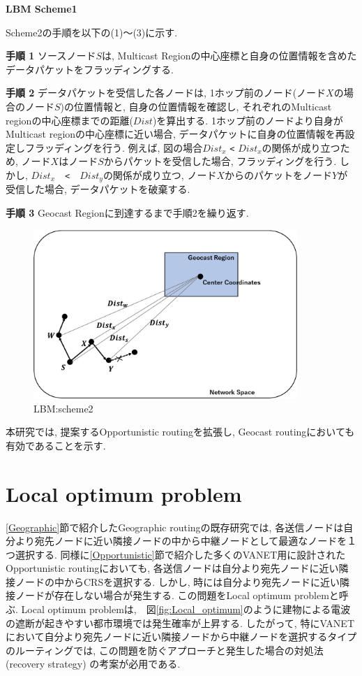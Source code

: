 \documentclass[10pt]{jreport}
\begin{document}
\par
\vspace{5mm}
\noindent
\textbf{LBM Scheme1}
\vspace{5mm}

Scheme2の手順を以下の(1)～(3)に示す.


\textbf{手順 1} ソースノード$S$は, Multicast Regionの中心座標と自身の位置情報を含めたデータパケットをフラッディングする.

\textbf{手順 2} データパケットを受信した各ノードは, 1ホップ前のノード(ノード$X$の場合のノード$S$)の位置情報と, 自身の位置情報を確認し, それぞれのMulticast regionの中心座標までの距離($Dist$)を算出する. 1ホップ前のノードより自身がMulticast regionの中心座標に近い場合, データパケットに自身の位置情報を再設定しフラッディングを行う.
例えば, 図の場合$Dist_x$ \verb|<| $Dist_x$の関係が成り立つため, ノード$X$はノード$S$からパケットを受信した場合, フラッディングを行う. しかし, $Dist_x$　\verb|<|　$Dist_y$の関係が成り立つ, ノード$X$からのパケットをノード$Y$が受信した場合, データパケットを破棄する.

\textbf{手順 3} Geocast Regionに到達するまで手順2を繰り返す.



\begin{figure}[!ht]
	\centering
	\includegraphics[width=100mm]{figures/Scheme2.eps}
	\caption{LBM:scheme2}
	\label{fig:scheme2}
\end{figure}

本研究では, 提案するOpportunistic routingを拡張し, Geocast routingにおいても有効であることを示す.



\section{Local optimum problem}
\label{local_optimum_problem}
\ref{Geographic}節で紹介したGeographic routingの既存研究では, 各送信ノードは自分より宛先ノードに近い隣接ノードの中から中継ノードとして最適なノードを１つ選択する. 同様に\ref{Opportunistic}節で紹介した多くのVANET用に設計されたOpportunistic routingにおいても, 各送信ノードは自分より宛先ノードに近い隣接ノードの中からCRSを選択する. しかし, 時には自分より宛先ノードに近い隣接ノードが存在しない場合が発生する. この問題をLocal optimum problem\cite{6}と呼ぶ. Local optimum problemは,　図\ref{fig:Local_optimum}のように建物による電波の遮断が起きやすい都市環境では発生確率が上昇する. したがって, 特にVANETにおいて自分より宛先ノードに近い隣接ノードから中継ノードを選択するタイプのルーティングでは, この問題を防ぐアプローチと発生した場合の対処法(recovery strategy) の考案が必用である.
\end{document}
